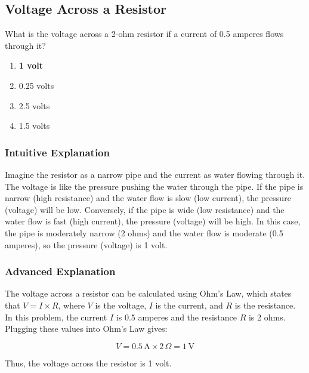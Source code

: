 \subsection{Voltage Across a Resistor}
\label{T5D10}

\begin{tcolorbox}[colback=gray!10!white,colframe=black!75!black,title=T5D10]
What is the voltage across a 2-ohm resistor if a current of 0.5 amperes flows through it?
\begin{enumerate}[noitemsep]
    \item \textbf{1 volt}
    \item 0.25 volts
    \item 2.5 volts
    \item 1.5 volts
\end{enumerate}
\end{tcolorbox}

\subsubsection*{Intuitive Explanation}
Imagine the resistor as a narrow pipe and the current as water flowing through it. The voltage is like the pressure pushing the water through the pipe. If the pipe is narrow (high resistance) and the water flow is slow (low current), the pressure (voltage) will be low. Conversely, if the pipe is wide (low resistance) and the water flow is fast (high current), the pressure (voltage) will be high. In this case, the pipe is moderately narrow (2 ohms) and the water flow is moderate (0.5 amperes), so the pressure (voltage) is 1 volt.

\subsubsection*{Advanced Explanation}
The voltage across a resistor can be calculated using Ohm's Law, which states that \( V = I \times R \), where \( V \) is the voltage, \( I \) is the current, and \( R \) is the resistance. In this problem, the current \( I \) is 0.5 amperes and the resistance \( R \) is 2 ohms. Plugging these values into Ohm's Law gives:

\[
V = 0.5 \, \text{A} \times 2 \, \Omega = 1 \, \text{V}
\]

Thus, the voltage across the resistor is 1 volt.